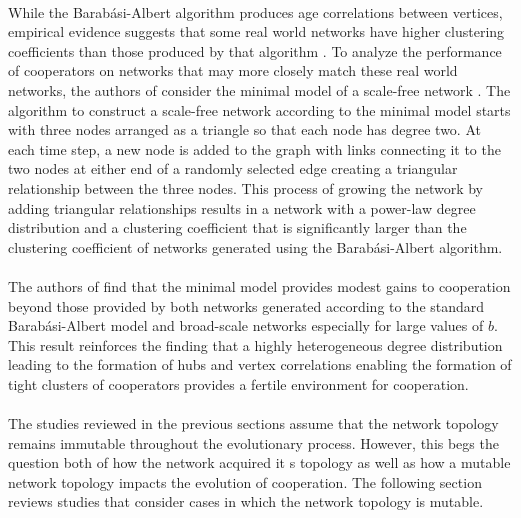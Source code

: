 \documentclass{article}
\begin{document}
	\paragraph{}While the Barab\'{a}si-Albert algorithm produces age correlations between vertices, empirical evidence suggests that some real world networks have higher clustering coefficients than those produced by that algorithm \cite{Dorogovtsev2003}.  To analyze the performance of cooperators on networks that may more closely match these real world networks, the authors of \cite{Santos2006a} consider the minimal model of a scale-free network \cite{Dorogovtsev2001}.  The algorithm to construct a scale-free network according to the minimal model starts with three nodes arranged as a triangle so that each node has degree two.  At each time step, a new node is added to the graph with links connecting it to the two nodes at either end of a randomly selected edge creating a triangular relationship between the three nodes.  This process of growing the network by adding triangular relationships results in a network with a power-law degree distribution and a clustering coefficient that is significantly larger than the clustering coefficient of networks generated using the Barab\'{a}si-Albert algorithm.
	\paragraph{}The authors of \cite{Santos2006a} find that the minimal model provides modest gains to cooperation beyond those provided by both networks generated according to the standard Barab\'{a}si-Albert model and broad-scale networks especially for large values of $b$.  This result reinforces the finding that a highly heterogeneous degree distribution leading to the formation of hubs and vertex correlations enabling the formation of tight clusters of cooperators provides a fertile environment for cooperation.
	\paragraph{}The studies reviewed in the previous sections assume that the network topology remains immutable throughout the evolutionary process.  However, this begs the question both of how the network acquired it s topology as well as how a mutable network topology impacts the evolution of cooperation.  The following section reviews studies that consider cases in which the network topology is mutable.
	\newpage
\end{document}
